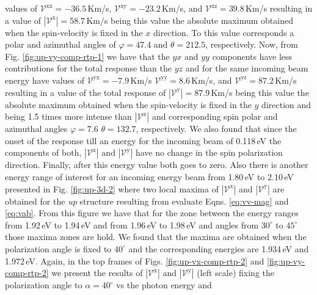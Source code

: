 \documentclass[prb,11pt,tightenlines,twocolumn,aps]{revtex4-1}
\begin{document}
values of 
% 
$\mathcal{V}^{\mathrm{xx}}=-36.5$\,Km/s,
$\mathcal{V}^{\mathrm{xy}}=-23.2$\,Km/s, and
$\mathcal{V}^{\mathrm{xz}}= 39.8$\,Km/s 
% 
resulting in a value of
% 
$|\mathcal{V}^{\mathrm{x}}|=58.7$\,Km/s 
% 
being this value the absolute maximum obtained when the spin-velocity is fixed
in the $x$ direction. To this value corresponds a polar and azimuthal angles of
$\varphi=47.4$ and $\theta=212.5$, respectively.
% 
Now, from Fig. \ref{fig:up-vy-comp-rtp-1} we have that the $yx$ and $yy$
components have less contributions for the total response than the $yz$ and for
the same incoming beam energy have values of 
% 
$\mathcal{V}^{\mathrm{yx}}= -7.9$\,Km/s 
$\mathcal{V}^{\mathrm{yy}}=  8.6$\,Km/s, and
$\mathcal{V}^{\mathrm{yz}}= 87.2$\,Km/s 
% 
resulting in a value of the total response of
% 
$|\mathcal{V}^{\mathrm{y}}|=87.9$\,Km/s
% 
being this value the absolute maximum obtained when the spin-velocity is fixed
in the $y$ direction and being 1.5 times more intense than
$|\mathcal{V}^{\mathrm{x}}|$ and corresponding spin polar and azimuthal angles
$\varphi=7.6$ $\theta=132.7$, respectively. We also found that since the onset
of the response till an energy for the incoming beam of 0.118\,eV the components
of both, $|\mathcal{V}^{\mathrm{x}}|$ and $|\mathcal{V}^{\mathrm{y}}|$ have no
change in the spin polarization direction. Finally, after this energy value both
goes to zero.
Also there is another energy range of interest for an incoming energy beam from
1.80\,eV to 2.10\,eV presented in Fig. \ref{fig:up-3d-2} where two local maxima
of $|\mathcal{V}^{\mathrm{x}}|$ and $|\mathcal{V}^{\mathrm{y}}|$ are obtained
for the \emph{up} structure resulting from evaluate Eqns. \eqref{eq:vv-mag} and
\eqref{eq:vab}.
% 
From this figure we have that for the zone between the energy ranges from
1.92\,eV to 1.94\,eV and from 1.96\,eV to 1.98\,eV and angles from $30^{\circ}$
to $45^{\circ}$ those maxima zones are hold. 
% 
We found that the maxima are obtained when the polarization angle is fixed to
$40^{\circ}$ and the corresponding energies are 1.934\,eV and 1.972\,eV.
% 
Again, in the top frames of Figs. \ref{fig:up-vx-comp-rtp-2} and 
% 
\ref{fig:up-vy-comp-rtp-2} we present the results of
$|\mathcal{V}^{\mathrm{x}}|$ and $|\mathcal{V}^{\mathrm{y}}|$ (left scale)
fixing the polarization angle to $\alpha=40^{\circ}$ vs the photon energy and
\end{document}
